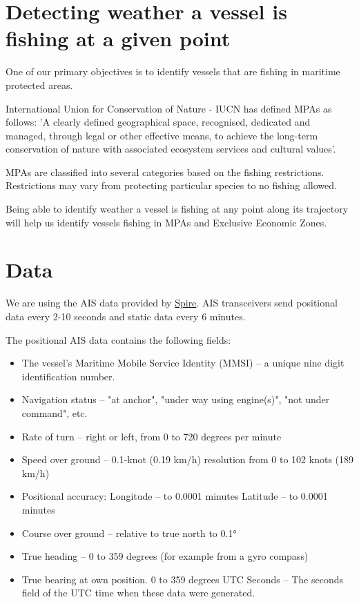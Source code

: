 \section{Detecting weather a vessel is fishing at a given point}
One of our primary objectives is to identify vessels that are fishing in maritime protected areas.

International Union for Conservation of Nature - IUCN has defined MPAs as follows:
'A clearly defined geographical space, recognised, dedicated and managed, through legal or other effective means, to achieve the long-term conservation of nature with associated ecosystem services and cultural values'.

MPAs are classified into several categories based on the fishing restrictions. Restrictions may vary from protecting particular species to no fishing allowed.

Being able to identify weather a vessel is fishing at any point along its trajectory will help us identify vessels fishing in MPAs and Exclusive Economic Zones.

\section{Data}

We are using the AIS data provided by \href{https://spire.com/}{Spire}.
AIS transceivers send positional data every 2-10 seconds and static data every 6 minutes.

The positional AIS data contains the following fields:
\begin{itemize}
\item The vessel's Maritime Mobile Service Identity (MMSI) – a unique nine digit identification number.
\item Navigation status – "at anchor", "under way using engine(s)", "not under command", etc.
\item Rate of turn – right or left, from 0 to 720 degrees per minute
\item Speed over ground – 0.1-knot (0.19 km/h) resolution from 0 to 102 knots (189 km/h)
\item Positional accuracy:
Longitude – to 0.0001 minutes
Latitude – to 0.0001 minutes
\item Course over ground – relative to true north to 0.1°
\item True heading – 0 to 359 degrees (for example from a gyro compass)
\item True bearing at own position. 0 to 359 degrees
UTC Seconds – The seconds field of the UTC time when these data were generated.
\end{itemize}

